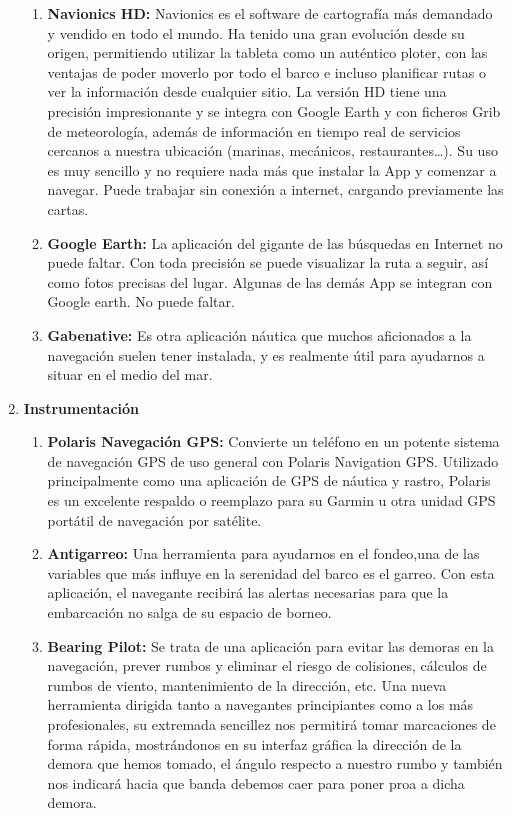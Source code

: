 \begin{enumerate}
\begin{enumerate}
   \item  \textbf{Navionics HD:} Navionics es el software de cartografía más demandado y vendido en todo el mundo. Ha tenido una gran evolución desde su origen, permitiendo utilizar la tableta como un auténtico ploter, con las ventajas de poder moverlo por todo el barco e incluso planificar rutas o ver la información desde cualquier sitio. La versión HD tiene una precisión impresionante y se integra con Google Earth y con ficheros Grib de meteorología, además de información en tiempo real de servicios cercanos a nuestra ubicación (marinas, mecánicos, restaurantes…). Su uso es muy sencillo y no requiere nada más que instalar la App y comenzar a navegar. Puede trabajar sin conexión a internet, cargando previamente las cartas.

 \item  \textbf{Google Earth:} La aplicación del gigante de las búsquedas en Internet no puede faltar. Con toda precisión se puede visualizar la ruta a seguir, así como fotos precisas del lugar. Algunas de las demás App se integran con Google earth. No puede faltar.
   \item   \textbf{Gabenative:} Es otra aplicación náutica que muchos aficionados a la navegación suelen tener instalada, y es realmente útil para ayudarnos a situar en el medio del mar.
\end{enumerate}
\item\textbf{Instrumentación}

 \begin{enumerate}

  \item  \textbf{Polaris Navegación GPS:} Convierte un teléfono en un potente sistema de navegación GPS de uso general con Polaris Navigation GPS. Utilizado principalmente como una aplicación de GPS de náutica y rastro, Polaris es un excelente respaldo o reemplazo para su Garmin u otra unidad GPS portátil de navegación por satélite.

\item \textbf{Antigarreo:} Una herramienta para ayudarnos en el fondeo,una de las variables que más influye en la serenidad del barco es el garreo. Con esta aplicación, el navegante recibirá las alertas necesarias para que la embarcación no salga de su espacio de borneo.
\item \textbf{Bearing Pilot:} Se trata de una aplicación para evitar las demoras en la navegación, prever rumbos y eliminar el riesgo de colisiones, cálculos de rumbos de viento, mantenimiento de la dirección, etc. Una nueva herramienta dirigida tanto a navegantes principiantes como a los más profesionales, su extremada sencillez nos permitirá tomar marcaciones de forma rápida, mostrándonos en su interfaz gráfica la dirección de la demora que hemos tomado, el ángulo respecto a nuestro rumbo y también nos indicará hacia que banda debemos caer para poner proa a dicha demora.


\end{enumerate}
\end{enumerate}
